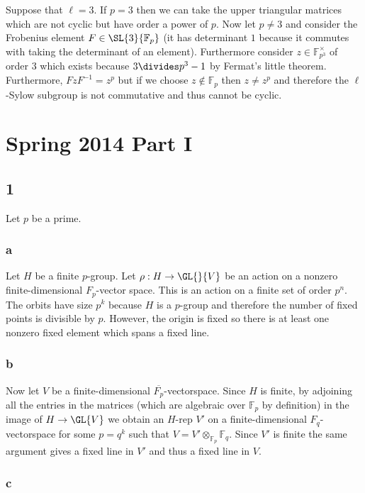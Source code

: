 \documentclass[12pt]{article}
\renewcommand{\F}{\mathbb{F}}
\begin{document}
Suppose that $\ell = 3$. If $p = 3$ then we can take the upper triangular matrices which are not cyclic but have order a power of $p$. Now let $p \neq 3$ and consider the Frobenius element $F \in \SL{3}{\F_p}$ (it has determinant $1$ because it commutes with taking the determinant of an element). Furthermore consider $z \in \F_{p^3}^\times$ of order $3$ which exists because $3 \divides p^3 - 1$ by Fermat's little theorem. Furthermore, $F z F^{-1} = z^p$ but if we choose $z \notin \F_p$ then $z \neq z^p$ and therefore the $\ell$-Sylow subgroup is not commutative and thus cannot be cyclic.

\section{Spring 2014 Part I}

\subsection{1}

Let $p$ be a prime.

\subsubsection{a}

Let $H$ be a finite $p$-group. Let $\rho : H \to \GL{}{V}$ be an action on a nonzero finite-dimensional $F_p$-vector space. This is an action on a finite set of order $p^n$. The orbits have size $p^k$ because $H$ is a $p$-group and therefore the number of fixed points is divisible by $p$. However, the origin is fixed so there is at least one nonzero fixed element which spans a fixed line.

\subsubsection{b}

Now let $V$ be a finite-dimensional $\overline{F_p}$-vectorspace. Since $H$ is finite, by adjoining all the entries in the matrices (which are algebraic over $\F_p$ by definition) in the image of $H \to \GL{V}$ we obtain an $H$-rep $V'$ on a finite-dimensional $F_q$-vectorspace for some $p = q^k$ such that $V = V' \otimes_{\F_p} \F_q$. Since $V'$ is finite the same argument gives a fixed line in $V'$ and thus a fixed line in $V$.

\subsubsection{c}
\end{document}

